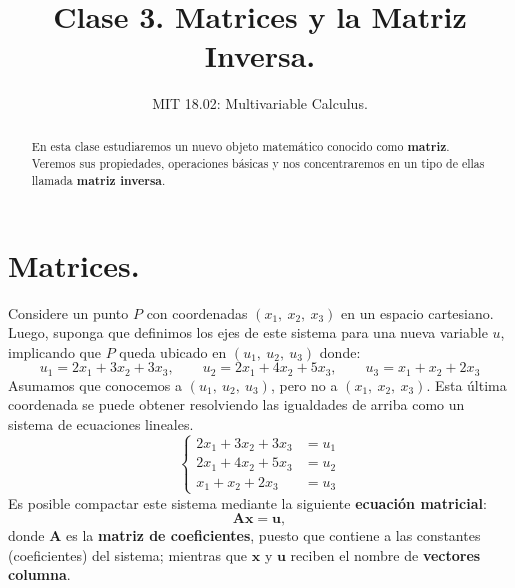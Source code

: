 \documentclass[12pt]{article}
\title{Clase 3. Matrices y la Matriz Inversa.}
\author{MIT 18.02: Multivariable Calculus.}
\date{}
\begin{document}
\newcommand{\vecmat}[1]{\mathbf{#1}}                          %
\newcommand{\unitvec}[1]{\vecmat{\hat{#1}}}                   %
\newcommand{\overvec}[1]{\overrightarrow{#1}}                 %
\newcommand{\invmat}[1]{\vecmat{#1}^{-1}}                     %
\newcommand{\transmat}[1]{\vecmat{#1}^{T}}                    %
\newcommand{\Adj}[0]{\text{Adj}}                              %
\newcommand{\R}[0]{\mathbb{R}}                                %
\newcommand{\N}[0]{\mathbb{N}}                                %

\maketitle

\begin{abstract}
\noindent En esta clase estudiaremos un nuevo objeto matemático conocido como \textbf{matriz}. Veremos sus propiedades, operaciones básicas y nos concentraremos en un tipo de ellas llamada \textbf{matriz inversa}.
\end{abstract}


\section{Matrices.}

Considere un punto $P$ con coordenadas $(x_{1}, \ x_{2}, \ x_{3})$ en un espacio cartesiano. Luego, suponga que definimos los ejes de este sistema para una nueva variable $u$, implicando que $P$ queda ubicado en $(u_{1}, \ u_{2}, \ u_{3})$ donde:
\[
  u_{1} = 2x_{1} + 3x_{2} + 3x_{3}, \qquad
  u_{2} = 2x_{1} + 4x_{2} + 5x_{3}, \qquad
  u_{3} =  x_{1} + x_{2} + 2x_{3}
\]
Asumamos que conocemos a $(u_{1}, \ u_{2}, \ u_{3})$, pero no a $(x_{1}, \ x_{2}, \ x_{3})$. Esta última coordenada se puede obtener resolviendo las igualdades de arriba como un sistema de ecuaciones lineales.
\[
\left\{
\begin{aligned}
2x_{1} + 3x_{2} + 3x_{3} &= u_{1} \\
2x_{1} + 4x_{2} + 5x_{3} &= u_{2} \\
  x_{1} + x_{2} + 2x_{3} &= u_{3}
\end{aligned}
\right.
\]
Es posible compactar este sistema mediante la siguiente \textbf{ecuación matricial}:
\[
  \vecmat{A} \vecmat{x} = \vecmat{u},
\]
donde $\vecmat{A}$ es la \textbf{matriz de coeficientes}, puesto que contiene a las constantes (coeficientes) del sistema; mientras que $\vecmat{x}$ y $\vecmat{u}$ reciben el nombre de \textbf{vectores columna}.
\end{document}
